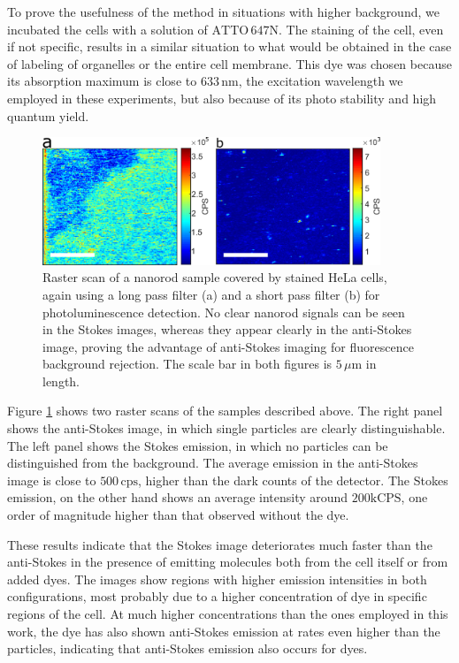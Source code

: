 \documentclass[journal=nalefd,manuscript=letter]{achemso}
\newcommand{\nm}{\ensuremath{\,\textrm{nm}}}
\newcommand{\um}{\ensuremath{\,\mu\textrm{m}}}
\newcommand{\CPS}{\ensuremath{\,\textrm{cps}}}
\newcommand{\atto}{\ensuremath{\textrm{ATTO}\,647\textrm{N}}}
\begin{document}
To prove the usefulness of the method in situations with higher
background, we incubated the cells with a solution of \atto.
The staining of the cell, even if not specific, results in a similar situation
to what would be obtained in the case of labeling of organelles or
the entire cell membrane. This dye was chosen because its absorption maximum is
close to $633\nm$, the excitation wavelength we employed in these
experiments, but also because of its photo stability and high quantum yield.

\begin{figure}[htp]
\centering
	\includegraphics[width=0.9\textwidth]{Figures/05_Stokes_AS_with_dye/stokes_as_with_dye.png}
	\caption{Raster scan of a nanorod sample covered by stained HeLa cells, again using a long pass filter (a) and a short pass filter (b) for photoluminescence detection.
	No clear nanorod signals can be seen in the Stokes images, whereas they appear clearly in the anti-Stokes image, proving the advantage of anti-Stokes imaging for fluorescence background rejection.
The scale bar in both figures is $5\um$ in length.}
	\label{fig:Stokes_AS_with_dye}
\end{figure}

Figure \ref{fig:Stokes_AS_with_dye} shows two raster scans of the samples
described above. The right panel shows the anti-Stokes image, in which single
particles are clearly distinguishable. The left panel shows the Stokes
emission, in which no particles can be distinguished from the background. The
average emission in the anti-Stokes image is close to $500\CPS$, higher than the
dark counts of the detector. The Stokes emission, on the other hand shows an
average intensity around $200\textrm{kCPS}$, one order of magnitude
higher than that observed without the dye.

These results indicate that the Stokes image deteriorates much faster than the
anti-Stokes in the presence of emitting molecules both from the cell itself or
from added dyes. The images show regions with higher
emission intensities in both configurations, most probably due to a higher concentration
of dye in specific regions of the cell. At much higher concentrations than
the ones employed in this work, the dye has also shown anti-Stokes emission at
rates even higher than the particles, indicating that anti-Stokes emission also occurs for dyes.
\end{document}

